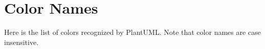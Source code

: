 %
%
% 
%
%
%
%
%
% 

\section{Color Names}


\vskip 11mm
Here is the list of colors recognized by PlantUML. Note that color names are
case insensitive.
\vskip 11mm

\newcommand{\colorname}[4]
{\cellcolor[HTML]{#4} & #2 \ifthenelse{\equal{#3}{c}}{\\ \hline }{ & }}


